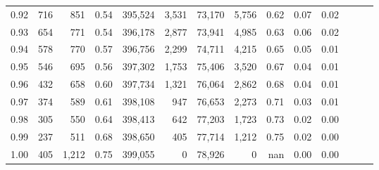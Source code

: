 \begin{tabular}{rrrrrrrrrrrrrr}
0.92 &    716 &    851 &  0.54 &  395,524 &    3,531 &  73,170 &   5,756 &  0.62 &  0.07 &      0.02 \\
0.93 &    654 &    771 &  0.54 &  396,178 &    2,877 &  73,941 &   4,985 &  0.63 &  0.06 &      0.02 \\
0.94 &    578 &    770 &  0.57 &  396,756 &    2,299 &  74,711 &   4,215 &  0.65 &  0.05 &      0.01 \\
0.95 &    546 &    695 &  0.56 &  397,302 &    1,753 &  75,406 &   3,520 &  0.67 &  0.04 &      0.01 \\
0.96 &    432 &    658 &  0.60 &  397,734 &    1,321 &  76,064 &   2,862 &  0.68 &  0.04 &      0.01 \\
0.97 &    374 &    589 &  0.61 &  398,108 &      947 &  76,653 &   2,273 &  0.71 &  0.03 &      0.01 \\
0.98 &    305 &    550 &  0.64 &  398,413 &      642 &  77,203 &   1,723 &  0.73 &  0.02 &      0.00 \\
0.99 &    237 &    511 &  0.68 &  398,650 &      405 &  77,714 &   1,212 &  0.75 &  0.02 &      0.00 \\
1.00 &    405 &  1,212 &  0.75 &  399,055 &        0 &  78,926 &       0 &   nan &  0.00 &      0.00 \\
\bottomrule
\end{tabular}
